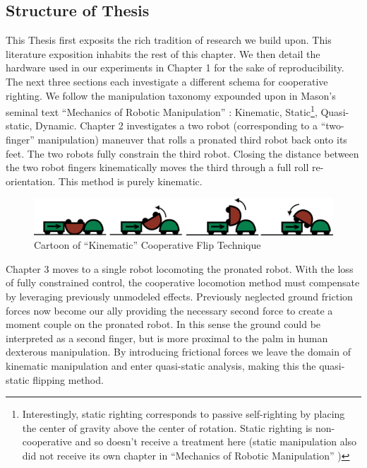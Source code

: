 \documentclass[letterpaper]{report}
\begin{document}
\subsection{Structure of Thesis}
This Thesis first exposits the rich tradition of research we build upon. This literature exposition inhabits the rest of this chapter.
We then detail the hardware used in our experiments in Chapter 1 for the sake of reproducibility.
The next three sections each investigate a different schema for cooperative righting.
We follow the manipulation taxonomy expounded upon in Mason's seminal text ``Mechanics of Robotic Manipulation'' \cite{MasonMORMBook}: Kinematic, Static\footnote{Interestingly, static righting corresponds to passive self-righting by placing the center of gravity above the center of rotation. Static righting is non-cooperative and so doesn't receive a treatment here (static manipulation also did not receive its own chapter in ``Mechanics of Robotic Manipulation'' \cite{MasonMORMBook})}, Quasi-static, Dynamic.
Chapter 2 investigates a two robot (corresponding to a ``two-finger'' manipulation) maneuver that rolls a pronated third robot back onto its feet.
The two robots fully constrain the third robot. Closing the distance between the two robot fingers kinematically moves the third through a full roll re-orientation.
This method is purely kinematic.

\begin{figure}[ht]
\centering
\includegraphics[width=1.0\textwidth]{Kinematic_CoopCartoon.png}
\caption{Cartoon of ``Kinematic'' Cooperative Flip Technique}
\end{figure}

Chapter 3 moves to a single robot locomoting the pronated robot. With the loss of fully constrained control, the cooperative locomotion method must compensate by leveraging previously unmodeled effects.
Previously neglected ground friction forces now become our ally providing the necessary second force to create a moment couple on the pronated robot.
In this sense the ground could be interpreted as a second finger, but is more proximal to the palm in human dexterous manipulation.
By introducing frictional forces we leave the domain of kinematic manipulation and enter quasi-static analysis, making this the quasi-static flipping method.
\end{document}

